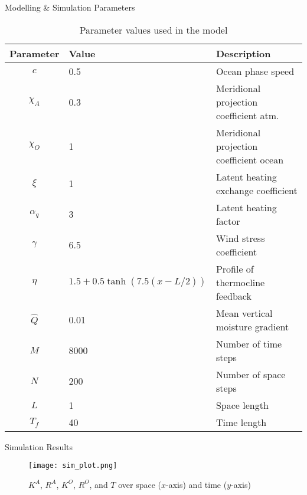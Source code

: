 \documentclass[9pt,xcolor=dvipsnames]{beamer}
\begin{document}
\begin{frame}{Modelling \& Simulation Parameters}
    \begin{table}[h!]
    \centering
    \begin{tabular}{|c|l|l|}
        \hline
        \textbf{Parameter} & \textbf{Value} & \textbf{Description} \\ \hline
        $c$              & 0.5            &    Ocean phase speed                  \\ \hline
        $\chi_A$           & 0.3            &     Meridional projection coefficient atm.                 \\ \hline
        $\chi_O$           & 1              &     Meridional projection coefficient ocean                   \\ \hline
        $\xi$              & 1              &  Latent heating exchange coefficient                    \\ \hline
        $\alpha_q$         & 3              &     Latent heating factor                 \\ \hline
        $\gamma$           & 6.5            &   Wind stress coefficient                   \\ \hline
        $\eta$             & $1.5 + 0.5 \tanh(7.5(x - L/2))$ &   Profile of thermocline feedback   \\ \hline
        $\hat{Q}$          & 0.01           &    Mean vertical moisture gradient                  \\ \hline
        $M$                & {\color{red}8000}          &  {\color{red} Number of time steps} \\ \hline
        $N$                & {\color{red} 200}            &  {\color{red}Number of space steps} \\ \hline
        $L$                & 1              & Space length         \\ \hline
        $T_f$              & 40             & Time length          \\ \hline
    \end{tabular}
    \caption*{Parameter values used in the model}
    \label{tab:parameters}
\end{table}

\end{frame}

\begin{frame}{Simulation Results}
\begin{figure}
    \centering
    \texttt{[image: sim\_plot.png]}
    \caption*{$K^A$, $R^A$, $K^O$, $R^O$, and $T$ over space ($x$-axis) and time ($y$-axis)}
\end{figure}
    
\end{frame}
\end{document}
